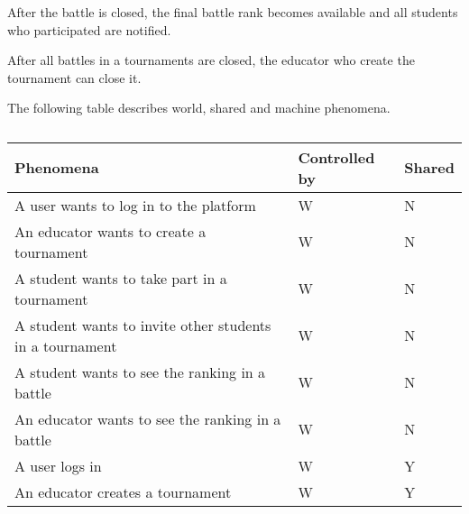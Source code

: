 After the battle is closed, the final battle rank becomes available and all students who participated are notified.

After all battles in a tournaments are closed, the educator who create the tournament can close it.

The following table describes world, shared and machine phenomena.
\begin{center} %
    \begin{longtable}{|p{8.7cm}|p{3cm}|p{3cm}|}
        \caption[Phenomena Table]{}
        \label{table:phenomena}
        \endlastfoot
        \hline
        \rowcolor{gray!50}
        \textbf{Phenomena}                                                                                                                    & \textbf{Controlled by} & \textbf{Shared} \\ \hline
        A user wants to log in to the platform                                                                                                & W                      & N               \\ \hline
        An educator wants to create a tournament                                                                                              & W                      & N               \\ \hline
        A student wants to take part in a tournament                                                                                          & W                      & N               \\ \hline
        A student wants to invite other students in a tournament                                                                              & W                      & N               \\ \hline
        A student wants to see the ranking in a battle                                                                                        & W                      & N               \\ \hline
        An educator wants to see the ranking in a battle                                                                                      & W                      & N               \\ \hline
        A user logs in                                                                                                                        & W                      & Y               \\ \hline
        An educator creates a tournament                                                                                                      & W                      & Y               \\ \hline

\end{longtable}
\end{center}
